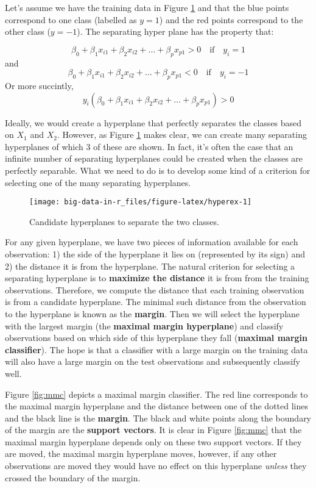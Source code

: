 \documentclass[
]{book}
\begin{document}
Let's assume we have the training data in Figure \ref{fig:hyperex} and that the blue points correspond to one class (labelled as \(y = 1\)) and the red points correspond to the other class (\(y = -1\)). The separating hyper plane has the property that:

\[
\beta_0 + \beta_1x_{i1} + \beta_2x_{i2} + \dots + \beta_px_{p1} > 0 \quad \text{if} \quad y_i = 1
\]
and
\[
\beta_0 + \beta_1x_{i1} + \beta_2x_{i2} + \dots + \beta_px_{p1} < 0 \quad \text{if} \quad y_i = -1
\]
Or more succintly,
\[
y_i(\beta_0 + \beta_1x_{i1} + \beta_2x_{i2} + \dots + \beta_px_{p1}) > 0
\]

Ideally, we would create a hyperplane that perfectly separates the classes based on \(X_1\) and \(X_2\). However, as Figure \ref{fig:hyperex} makes clear, we can create many separating hyperplanes of which 3 of these are shown. In fact, it's often the case that an infinite number of separating hyperplanes could be created when the classes are perfectly separable. What we need to do is to develop some kind of a criterion for selecting one of the many separating hyperplanes.

\begin{figure}
\texttt{[image: big-data-in-r\_files/figure-latex/hyperex-1]} \caption{Candidate hyperplanes to separate the two classes.}\label{fig:hyperex}
\end{figure}

For any given hyperplane, we have two pieces of information available for each observation: 1) the side of the hyperplane it lies on (represented by its sign) and 2) the distance it is from the hyperplane. The natural criterion for selecting a separating hyperplane is to \textbf{maximize the distance} it is from from the training observations. Therefore, we compute the distance that each training observation is from a candidate hyperplane. The minimal such distance from the observation to the hyperplane is known as the \textbf{margin}. Then we will select the hyperplane with the largest margin (the \textbf{maximal margin hyperplane}) and classify observations based on which side of this hyperplane they fall (\textbf{maximal margin classifier}). The hope is that a classifier with a large margin on the training data will also have a large margin on the test observations and subsequently classify well.

Figure \ref{fig:mmc} depicts a maximal margin classifier. The red line corresponds to the maximal margin hyperplane and the distance between one of the dotted lines and the black line is the \textbf{margin}. The black and white points along the boundary of the margin are the \textbf{support vectors}. It is clear in Figure \ref{fig:mmc} that the maximal margin hyperplane depends only on these two support vectors. If they are moved, the maximal margin hyperplane moves, however, if any other observations are moved they would have no effect on this hyperplane \emph{unless} they crossed the boundary of the margin.
\end{document}
